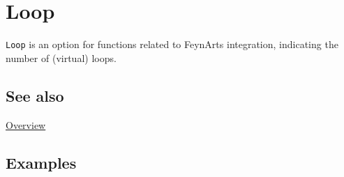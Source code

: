 \documentclass[../FeynCalcManual.tex]{subfiles}
\begin{document}
\hypertarget{loop}{
\section{Loop}\label{loop}}

\texttt{Loop} is an option for functions related to FeynArts
integration, indicating the number of (virtual) loops.

\subsection{See also}

\hyperlink{toc}{Overview}

\subsection{Examples}
\end{document}
